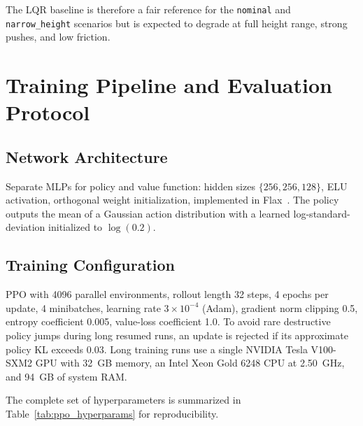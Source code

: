 \documentclass[conference]{IEEEtran}
\begin{document}
The LQR baseline is therefore a fair reference for the \texttt{nominal}
and \texttt{narrow\_height} scenarios but is expected to degrade at
full height range, strong pushes, and low friction.

\section{Training Pipeline and Evaluation Protocol}

\subsection{Network Architecture}
Separate MLPs for policy and value function: hidden sizes
$\{256, 256, 128\}$, ELU activation, orthogonal weight initialization,
implemented in Flax~\cite{flax}.
The policy outputs the mean of a Gaussian action distribution with a
learned log-standard-deviation initialized to $\log(0.2)$.

\subsection{Training Configuration}
PPO with 4096 parallel environments, rollout length 32 steps,
4 epochs per update, 4 minibatches, learning rate
$3\!\times\!10^{-4}$ (Adam), gradient norm clipping 0.5,
entropy coefficient 0.005, value-loss coefficient 1.0.
To avoid rare destructive policy jumps during long resumed runs, an update is
rejected if its approximate policy KL exceeds 0.03.
Long training runs use a single NVIDIA Tesla V100-SXM2 GPU with
\SI{32}{GB} memory, an Intel Xeon Gold 6248 CPU at \SI{2.50}{GHz},
and \SI{94}{GB} of system RAM.

The complete set of hyperparameters is summarized in
Table~\ref{tab:ppo_hyperparams} for reproducibility.
\end{document}
